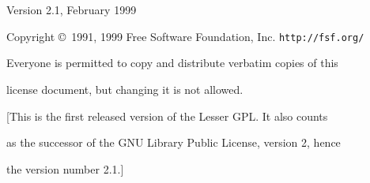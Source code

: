 
\section[GNU Lesser General Public License]{}

\begin{center}
{\normalsize Version 2.1, February 1999}
\end{center}

\begin{center}
{\parindent 0in

Copyright \copyright\  1991, 1999 Free Software Foundation, Inc. \texttt{http://fsf.org/}

\bigskip

Everyone is permitted to copy and distribute verbatim copies of this

license document, but changing it is not allowed.

\bigskip

[This is the first released version of the Lesser GPL. It also counts

as the successor of the GNU Library Public License, version 2, hence

the version number 2.1.]
}
\end{center}

\smallskip

